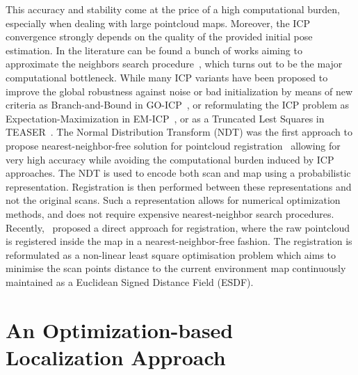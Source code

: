 This accuracy and stability come at the price of a high computational burden, especially when dealing with large pointcloud maps.
Moreover, the ICP convergence strongly depends on the quality of the provided initial pose estimation.
In the literature can be found a bunch of works aiming to approximate the neighbors search procedure~\cite{muja2009fast, elseberg2012comparison}, which turns out
to be the major computational bottleneck. While many ICP variants have been proposed to improve the 
global robustness against noise or bad initialization by means of new criteria as Branch-and-Bound in GO-ICP~\cite{yang2015go},
or reformulating the ICP problem as Expectation-Maximization in EM-ICP~\cite{granger2002multi},
or as a Truncated Lest Squares in TEASER~\cite{yang2020teaser}.
The Normal Distribution Transform (NDT) was the first approach to propose nearest-neighbor-free solution for pointcloud registration~\cite{magnusson2007scan, hong2017probabilistic}
allowing for very high accuracy while avoiding the computational burden induced by ICP approaches.
The NDT is used to encode both scan and map using a probabilistic representation.
Registration is then performed between these representations and not the original scans.
Such a representation allows for numerical optimization methods, and does not require expensive nearest-neighbor search procedures.
Recently,~\cite{caballero2021dll} proposed a direct approach for registration, where the raw pointcloud is registered inside the map
in a nearest-neighbor-free fashion. The registration is reformulated as a non-linear least square optimisation problem which aims to
minimise the scan points distance to the current environment map continuously maintained as a Euclidean Signed Distance Field (ESDF).

\section{An Optimization-based Localization Approach}
